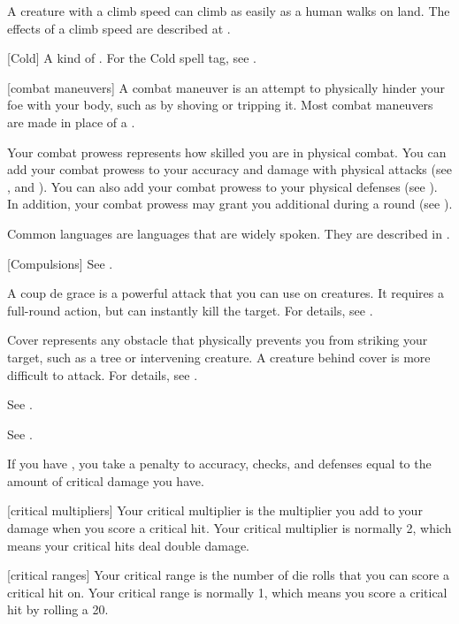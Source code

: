  A creature with a climb speed can climb as easily as a human walks on land.
The effects of a climb speed are described at .

[Cold] A kind of . For the Cold spell tag, see .

[combat maneuvers] A combat maneuver is an attempt to physically hinder your foe with your body, such as by shoving or tripping it.
Most combat maneuvers are made in place of a .

 Your combat prowess represents how skilled you are in physical combat.
You can add your combat prowess to your accuracy and damage with physical attacks (see , and ).
You can also add your combat prowess to your physical defenses (see ).
In addition, your combat prowess may grant you additional  during a round (see ).

 Common languages are languages that are widely spoken.
They are described in .

[Compulsions] See .

 A coup de grace is a powerful attack that you can use on \helpless creatures.
It requires a full-round action, but can instantly kill the target.
For details, see .

 Cover represents any obstacle that physically prevents you from striking your target, such as a tree or intervening creature. A creature behind cover is more difficult to attack.
For details, see .

 See .

 See .

 If you have , you take a penalty to accuracy, checks, and defenses equal to the amount of critical damage you have.

[critical multipliers] Your critical multiplier is the multiplier you add to your damage when you score a critical hit.
Your critical multiplier is normally 2, which means your critical hits deal double damage.

[critical ranges] Your critical range is the number of die rolls that you can score a critical hit on.
Your critical range is normally 1, which means you score a critical hit by rolling a 20.

